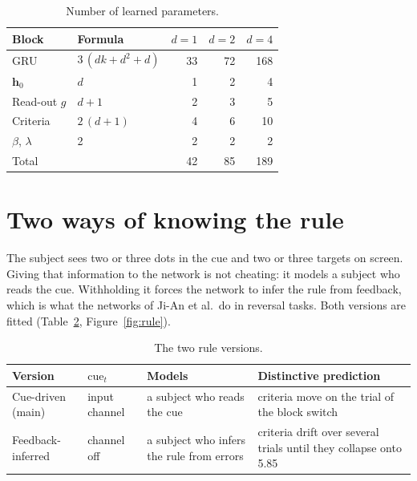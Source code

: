 \documentclass[11pt,a4paper]{article}
\newcommand{\vect}[1]{\bm{#1}}
\newcommand{\cue}{\mathrm{cue}}
\begin{document}
\begin{table}[H]
  \centering\small
  \caption{Number of learned parameters.}
  \label{tab:params}
  \begin{tabular}{llrrr}
    \toprule
    Block & Formula & $d=1$ & $d=2$ & $d=4$ \\
    \midrule
    GRU & $3\,(dk + d^2 + d)$ & 33 & 72 & 168 \\
    $\vect{h}_0$ & $d$ & 1 & 2 & 4 \\
    Read-out $g$ & $d + 1$ & 2 & 3 & 5 \\
    Criteria & $2\,(d + 1)$ & 4 & 6 & 10 \\
    $\beta$, $\lambda$ & 2 & 2 & 2 & 2 \\
    \midrule
    Total & & 42 & 85 & 189 \\
    \bottomrule
  \end{tabular}
\end{table}

\section{Two ways of knowing the rule}
\label{sec:rule}

The subject sees two or three dots in the cue and two or three targets on screen.
Giving that information to the network is not cheating: it models a subject who reads
the cue. Withholding it forces the network to infer the rule from feedback, which is
what the networks of Ji-An et al.\ do in reversal tasks. Both versions are fitted
(Table~\ref{tab:rule}, Figure~\ref{fig:rule}).

\begin{table}[H]
  \centering\small
  \caption{The two rule versions.}
  \label{tab:rule}
  \begin{tabular}{llp{4.5cm}p{5.5cm}}
    \toprule
    Version & $\cue_t$ & Models & Distinctive prediction \\
    \midrule
    Cue-driven (main) & input channel & a subject who reads the cue & criteria move on the trial of the block switch \\
    Feedback-inferred & channel off & a subject who infers the rule from errors & criteria drift over several trials until they collapse onto 5.85 \\
    \bottomrule
  \end{tabular}
\end{table}
\end{document}
